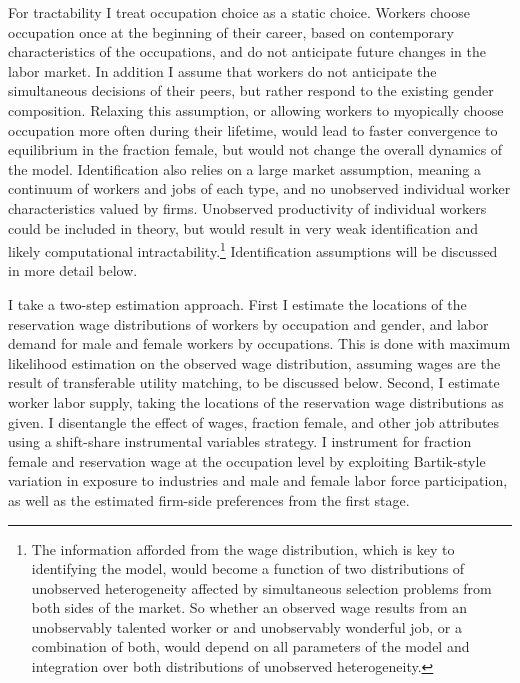 \documentclass[11pt]{article}
\begin{document}
For tractability I treat occupation choice as a static choice. Workers choose occupation once at the beginning of their career, based on contemporary characteristics of the occupations, and do not anticipate future changes in the labor market. In addition I assume that workers do not anticipate the simultaneous decisions of their peers, but rather respond to the existing gender composition. Relaxing this assumption, or allowing workers to myopically choose occupation more often during their lifetime, would lead to faster convergence to equilibrium in the fraction female, but would not change the overall dynamics of the model. Identification also relies on a large market assumption, meaning a continuum of workers and jobs of each type, and no unobserved individual worker characteristics valued by firms. Unobserved productivity of individual workers could be included in theory, but would result in very weak identification and likely computational intractability.\footnote{The information afforded from the wage distribution, which is key to identifying the model, would become a function of two distributions of unobserved heterogeneity affected by simultaneous selection problems from both sides of the market. So whether an observed wage results from an unobservably talented worker or and unobservably wonderful job, or a combination of both, would depend on all parameters of the model and integration over both distributions of unobserved heterogeneity.} Identification assumptions will be discussed in more detail below.
 


I take a two-step estimation approach. First I estimate the locations of the reservation wage distributions of workers by occupation and gender, and labor demand for male and female workers by occupations. This is done with maximum likelihood estimation on the observed wage distribution, assuming wages are the result of transferable utility matching, to be discussed below. Second, I estimate worker labor supply, taking the locations of the reservation wage distributions as given. I disentangle the effect of wages, fraction female, and other job attributes using a shift-share instrumental variables strategy. I instrument for fraction female and reservation wage at the occupation level by exploiting Bartik-style variation in exposure to industries and male and female labor force participation, as well as the estimated firm-side preferences from the first stage.
 
\end{document}
